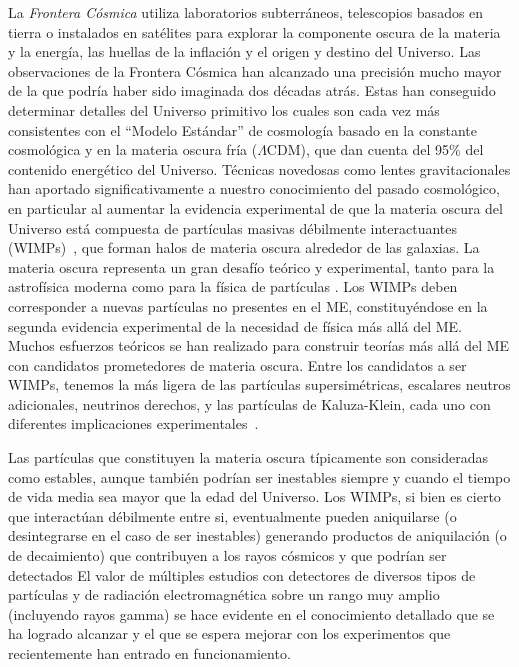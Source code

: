 La \emph{Frontera Cósmica} utiliza laboratorios subterráneos,
telescopios basados en tierra o instalados en satélites
para explorar la componente oscura de la materia y la energía, las huellas
de la inflación y el origen y destino del Universo. Las observaciones
de la Frontera Cósmica han alcanzado una precisión mucho mayor de la
que podría haber sido imaginada dos décadas atrás. Estas han conseguido
determinar detalles del Universo primitivo los cuales son cada vez más
consistentes con el ``Modelo Estándar'' de cosmología basado en la
constante cosmológica y en la materia oscura fría ($\Lambda$CDM), que
dan cuenta del 95\% del contenido energético del Universo. Técnicas
novedosas como lentes gravitacionales han aportado significativamente
a nuestro conocimiento del pasado cosmológico, en particular al
aumentar la evidencia experimental de que la materia oscura del
Universo está compuesta de partículas masivas débilmente
interactuantes (WIMPs)~\cite{Jungman:1995df,Bertone:2004pz}, que forman
halos de materia oscura alrededor de las galaxias.
La materia oscura representa un gran desafío teórico y experimental,
tanto para la astrofísica moderna como para la física de partículas
\cite{Jungman:1995df,Bertone:2004pz, Amsler:2008zzb, Bertone:2010}.
Los WIMPs deben corresponder a nuevas partículas no presentes en el
ME, constituyéndose en la segunda evidencia experimental de la necesidad
de física más allá del ME.  Muchos esfuerzos teóricos se han realizado
para construir teorías más allá del ME con candidatos
prometedores de materia oscura. Entre los candidatos a ser WIMPs,
tenemos la más ligera de las partículas supersimétricas, escalares
neutros adicionales, neutrinos derechos, y las partículas de
Kaluza-Klein, cada uno con diferentes implicaciones experimentales~\cite{Bertone:2010}.


Las partículas que constituyen la materia oscura típicamente son
consideradas como estables, aunque también podrían ser
inestables siempre y cuando el tiempo de vida media sea mayor que la
edad del Universo. Los WIMPs, si bien es cierto que interactúan débilmente
entre si, eventualmente pueden aniquilarse (o desintegrarse en el caso
de ser inestables) generando productos de aniquilación (o de decaimiento)
que contribuyen a los rayos cósmicos y que podrían ser detectados
El valor de múltiples
estudios con detectores de diversos tipos de partículas y de radiación
electromagnética sobre un rango muy amplio (incluyendo rayos gamma) se
hace evidente en el conocimiento detallado que se ha logrado alcanzar
y el que se espera mejorar con los experimentos que recientemente han
entrado en funcionamiento.

